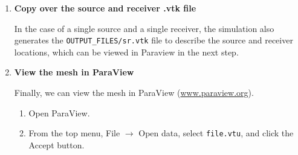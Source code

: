 \documentclass[oneside,english]{book}
\newenvironment{lyxcode}
{\begin{list}{}{
\setlength{\rightmargin}{\leftmargin}
\setlength{\listparindent}{0pt}%
\raggedright
\setlength{\itemsep}{0pt}
\setlength{\parsep}{0pt}
\normalfont\ttfamily}%
 \item[]}
{\end{list}}
\newcommand{\urlwithparentheses}[1]{(\url{#1})}
\begin{document}
\begin{enumerate}
\item \textbf{Copy over the source and receiver .vtk file}


In the case of a single source and a single receiver, the simulation
also generates the \texttt{OUTPUT\_FILES/sr.vtk} file to describe
the source and receiver locations, which can be viewed in Paraview
in the next step.

\item \textbf{View the mesh in ParaView}


Finally, we can view the mesh in ParaView \urlwithparentheses{www.paraview.org}.

\begin{enumerate}
\item Open ParaView.
\item From the top menu, \textsf{File} $\rightarrow$\textsf{ Open data},
select \texttt{file.vtu}, and click the \textsf{Accept} button.


\end{enumerate}
\end{enumerate}
\end{document}
